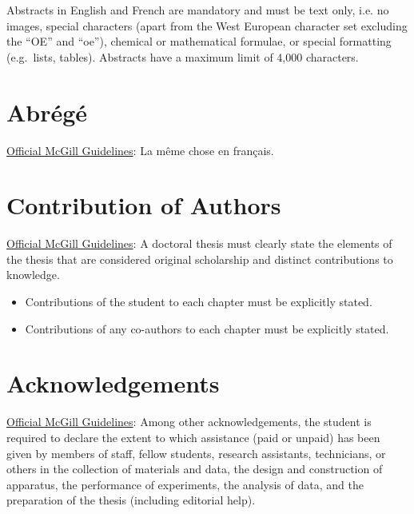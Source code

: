 \documentclass[
  letterpaper,
  12pt,
  oneside]{book}
\providecommand{\tightlist}{%
  \setlength{\itemsep}{0pt}\setlength{\parskip}{0pt}}
\begin{document}
Abstracts in English and French are mandatory and must be text only,
i.e. no images, special characters (apart from the West European
character set excluding the ``OE'' and ``oe''), chemical or mathematical
formulae, or special formatting (e.g.~lists, tables). Abstracts have a
maximum limit of 4,000 characters.


\chapter*{Abrégé}\label{abruxe9guxe9}


\href{https://www.mcgill.ca/gps/thesis/thesis-guidelines/preparation}{Official
McGill Guidelines}: La même chose en français.


\chapter*{Contribution of Authors}\label{contribution-of-authors}


\href{https://www.mcgill.ca/gps/thesis/thesis-guidelines/preparation}{Official
McGill Guidelines}: A doctoral thesis must clearly state the elements of
the thesis that are considered original scholarship and distinct
contributions to knowledge.

\begin{itemize}
\tightlist
\item
  Contributions of the student to each chapter must be explicitly
  stated.
\item
  Contributions of any co-authors to each chapter must be explicitly
  stated.
\end{itemize}


\chapter*{Acknowledgements}\label{acknowledgements}


\href{https://www.mcgill.ca/gps/thesis/thesis-guidelines/preparation}{Official
McGill Guidelines}: Among other acknowledgements, the student is
required to declare the extent to which assistance (paid or unpaid) has
been given by members of staff, fellow students, research assistants,
technicians, or others in the collection of materials and data, the
design and construction of apparatus, the performance of experiments,
the analysis of data, and the preparation of the thesis (including
editorial help).
\end{document}
